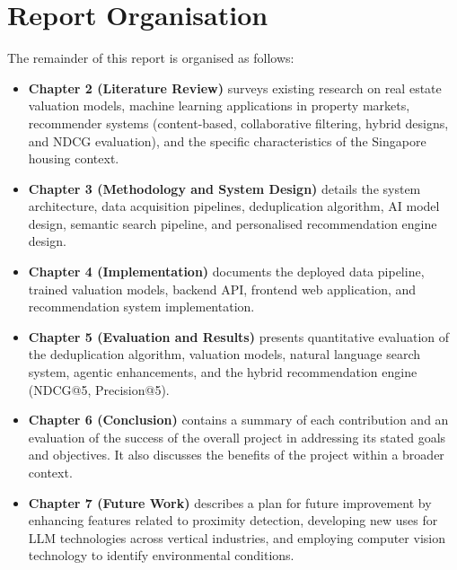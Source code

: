 \section{Report Organisation}

The remainder of this report is organised as follows:
\begin{itemize}
    \item \textbf{Chapter 2 (Literature Review)} surveys existing research on real estate valuation models, machine learning applications in property markets, recommender systems (content-based, collaborative filtering, hybrid designs, and NDCG evaluation), and the specific characteristics of the Singapore housing context.
    \item \textbf{Chapter 3 (Methodology and System Design)} details the system architecture, data acquisition pipelines, deduplication algorithm, AI model design, semantic search pipeline, and personalised recommendation engine design.
    \item \textbf{Chapter 4 (Implementation)} documents the deployed data pipeline, trained valuation models, backend API, frontend web application, and recommendation system implementation.
    \item \textbf{Chapter 5 (Evaluation and Results)} presents quantitative evaluation of the deduplication algorithm, valuation models, natural language search system, agentic enhancements, and the hybrid recommendation engine (NDCG@5, Precision@5).
    \item \textbf{Chapter 6 (Conclusion)} contains a summary of each contribution and an evaluation of the success of the overall project in addressing its stated goals and objectives. It also discusses the benefits of the project within a broader context.
    \item \textbf{Chapter 7 (Future Work)} describes a plan for future improvement by enhancing features related to proximity detection, developing new uses for LLM technologies across vertical industries, and employing computer vision technology to identify environmental conditions.
\end{itemize}

